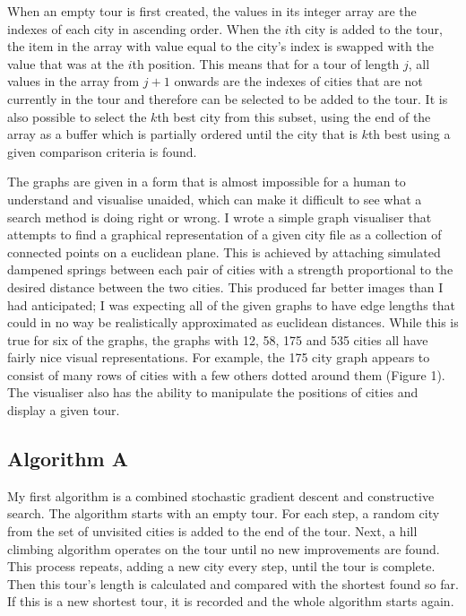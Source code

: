\documentclass[a4paper,11pt]{article}
\begin{document}
When an empty tour is first created, the values in its integer array are the
indexes of each city in ascending order. When the $i$th city is added to the
tour, the item in the array with value equal to the city's index is swapped
with the value that was at the $i$th position. This means that for a tour of
length $j$, all values in the array from $j+1$ onwards are the indexes of
cities that are not currently in the tour and therefore can be selected to be
added to the tour. It is also possible to select the $k$th best city from this
subset, using the end of the array as a buffer which is partially ordered until
the city that is $k$th best using a given comparison criteria is found.

The graphs are given in a form that is almost impossible for a human to
understand and visualise unaided, which can make it difficult to see what a
search method is doing right or wrong. I wrote a simple graph visualiser that
attempts to find a graphical representation of a given city file as a
collection of connected points on a euclidean plane. This is achieved by
attaching simulated dampened springs between each pair of cities with a
strength proportional to the desired distance between the two cities. This
produced far better images than I had anticipated; I was expecting all of the
given graphs to have edge lengths that could in no way be realistically
approximated as euclidean distances. While this is true for six of the graphs,
the graphs with 12, 58, 175 and 535 cities all have fairly nice visual
representations. For example, the 175 city graph appears to consist of many
rows of cities with a few others dotted around them (Figure 1). The visualiser
also has the ability to manipulate the positions of cities and display a given
tour.

\subsection*{Algorithm A}
My first algorithm is a combined stochastic gradient descent and constructive
search. The algorithm starts with an empty tour. For each step, a random city
from the set of unvisited cities is added to the end of the tour. Next, a
hill climbing algorithm operates on the tour until no new improvements are
found. This process repeats, adding a new city every step, until the tour is
complete. Then this tour's length is calculated and compared with the shortest
found so far. If this is a new shortest tour, it is recorded and the whole
algorithm starts again.
\end{document}
